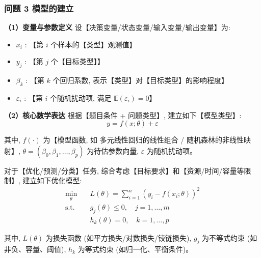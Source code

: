 
\subsubsection{问题 3 模型的建立}

\textbf{（1）变量与参数定义} \quad 设【决策变量/状态变量/输入变量/输出变量】为:
\begin{itemize}
  \item $x_i$ : 【第 $i$ 个样本的【类型】观测值】
  \item $y_j$ : 【第 $j$ 个【目标类型】】
  \item $\beta_k$ : 【第 $k$ 个回归系数, 表示【类型】对【目标类型】的影响程度】
  \item $\varepsilon_i$ : 【第 $i$ 个随机扰动项, 满足 $\mathbb{E}(\varepsilon_i)=0$】
\end{itemize}

\textbf{（2）核心数学表达} \quad 根据【题目条件 + 问题类型】, 建立如下【模型类型】:
\begin{equation}
  y = f(x; \theta) + \varepsilon
  \label{eq:model_q3}
\end{equation}

其中, $f(\cdot)$ 为【模型函数, 如 多元线性回归的线性组合 / 随机森林的非线性映射】, $\theta = (\beta_0, \beta_1, \ldots, \beta_p)$ 为待估参数向量, $\varepsilon$ 为随机扰动项。

对于【优化/预测/分类】任务, 综合考虑【目标要求】和【资源/时间/容量等限制】, 建立如下优化模型:
\begin{align}
  \min_{\theta} \quad & L(\theta) = \sum_{i=1}^{n} (y_i - f(x_i; \theta))^2 \\
  \text{s.t.} \quad & g_j(\theta) \leq 0, \quad j=1,\ldots,m \\
  & h_k(\theta) = 0, \quad k=1,\ldots,p \label{eq:constraints_q3}
\end{align}

其中, $L(\theta)$ 为损失函数 (如平方损失/对数损失/铰链损失), $g_j$ 为不等式约束 (如非负、容量、阈值), $h_k$ 为等式约束 (如归一化、平衡条件)。

